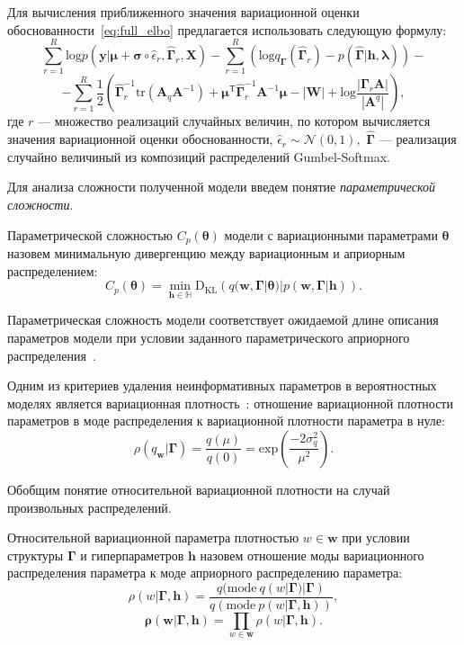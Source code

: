 Для вычисления приближенного значения вариационной оценки обоснованности~\eqref{eq:full_elbo} предлагается использовать следующую формулу:
\[
    \sum_{r=1}^R \text{log}p(\mathbf{y}|\boldsymbol{\mu}+\boldsymbol{\sigma} \circ \hat{\epsilon}_r, \hat{\boldsymbol{\Gamma}}_r, \mathbf{X}) - \sum_{r=1}^R \left(\text{log}q_{\boldsymbol{\Gamma}}(\hat{\boldsymbol{\Gamma}}_r) - p(\hat{\boldsymbol{\Gamma}}|\mathbf{h},\boldsymbol{\lambda})\right) -
\]
\[ -\sum_{r=1}^R\frac{1}{2}\left( \hat{\boldsymbol{\Gamma}}_r^{-1}\text{tr}(\mathbf{A}_q\mathbf{A}^{-1}) + \boldsymbol{\mu}^{\mathsf{T}}\hat{\boldsymbol{\Gamma}}_r^{-1}\mathbf{A}^{-1}\boldsymbol{\mu} - |\mathbf{W}| + \text{log}\frac{|\boldsymbol{\Gamma}_r\mathbf{A}|}{|\mathbf{A}^q|}\right),
\]
где $r$ --- множество реализаций случайных величин, по котором вычисляется значения вариационной оценки обоснованности, $\hat{\epsilon}_r \sim \mathcal{N}(0,1),$
 $\hat{\boldsymbol{\Gamma}}$ --- реализация случайно величиный из композиций распределений Gumbel-Softmax.

Для анализа сложности полученной модели введем понятие \textit{параметрической сложности}. 
\begin{defin}
Параметрической сложностью  $C_p(\boldsymbol{\theta})$ модели с вариационными параметрами $\boldsymbol{\theta}$ назовем минимальную дивергенцию между вариационным и априорным распределением:
\[
C_p(\boldsymbol{\theta}) = \min_{\mathbf{h} \in \mathbb{H}} \text{D}_\text{KL}\left(q(\mathbf{w}, \boldsymbol{\Gamma}|\boldsymbol{\theta})|p(\mathbf{w}, \boldsymbol{\Gamma}|\mathbf{h})\right).
\]
\end{defin}
Параметрическая сложность модели соответствует ожидаемой длине описания параметров модели при условии заданного параметрического априорного распределения~\cite{hinton_mdl}.

Одним из критериев удаления неинформативных параметров в вероятностных моделях является вариационная плотность~\cite{nips}: отношение вариационной плотности параметров в моде распределения к вариационной плотности параметра в нуле:
\[
    \rho(q_{\mathbf{w}}|\boldsymbol{\Gamma}) = \frac{q(\mu)}{q(0)} = \text{exp}\left(\frac{-2\sigma_q^2}{\mu^2}\right).
\]

Обобщим понятие относительной вариационной плотности на случай произвольных распределений.
\begin{defin}
Относительной вариационной параметра  плотностью $w \in \mathbf{w}$  при условии структуры $\boldsymbol{\Gamma}$ и гиперпараметров $\mathbf{h}$ назовем отношение моды вариационного распределения параметра к моде априорного распределению параметра:
\[
    \rho(w|\boldsymbol{\Gamma}, \mathbf{h}) = \frac{q(\text{mode}~q(w|\boldsymbol{\Gamma})|\boldsymbol{\Gamma})}{q(\text{mode}~p({w}|\boldsymbol{\Gamma}, \mathbf{h}))},
\]
\[
    \boldsymbol{\rho}(\mathbf{w}|\boldsymbol{\Gamma}, \mathbf{h}) = \prod_{w \in \mathbf{w}}\rho(w|\boldsymbol{\Gamma}, \mathbf{h}).
\]

\end{defin}

